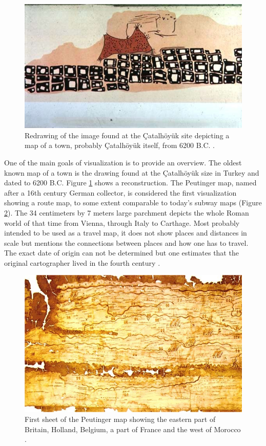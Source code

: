\begin{figure}[ht]
	\centering
	\includegraphics[width=0.75\linewidth]{figures/konya-town-map.jpg}
	\caption{Redrawing of the image found at the Çatalhöyük site depicting a map of a town, probably Çatalhöyük itself, from 6200 B.C. \cite{Web:KonyaTownMap}.}
	\label{fig:konya-town-map}
\end{figure}
%
One of the main goals of visualization is to provide an overview.
The oldest known map of a town is the drawing found at the Çatalhöyük size in Turkey and dated to 6200 B.C. 
Figure \ref{fig:konya-town-map} shows a reconstruction.
The Peutinger map, named after a 16th century German collector, is considered the first visualization showing a route map, to some extent comparable to today's subway maps (Figure \ref{fig:peutinger-map}).
The 34 centimeters by 7 meters large parchment depicts the whole Roman world of that time from Vienna, through Italy to Carthage.
Most probably intended to be used as a travel map, it does not show places and distances in scale but mentions the connections between places and how one has to travel.
The exact date of origin can not be determined but one estimates that the original cartographer lived in the fourth century \cite{Friendly:95:Milestones,Web:LiviusOrg:PeutingerMap}.
%
\begin{figure}[ht]
	\centering
	\includegraphics[width=0.75\linewidth]{figures/peutinger-map.jpg}
	\caption{First sheet of the Peutinger map showing the eastern part of Britain, Holland, Belgium, a part of France and the west of Morocco \cite{Web:LiviusOrg:PeutingerMap}.}
	\label{fig:peutinger-map}
\end{figure}

